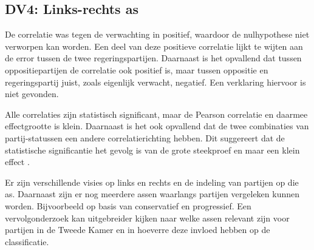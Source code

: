 \subsection{DV4: Links-rechts as}
De correlatie was tegen de verwachting in positief, waardoor de nulhypothese niet verworpen kan worden. Een deel van deze positieve correlatie lijkt te wijten aan de error tussen de twee regeringspartijen. Daarnaast is het opvallend dat tussen oppositiepartijen de correlatie ook positief is, maar tussen oppositie en regeringspartij juist, zoals eigenlijk verwacht, negatief. Een verklaring hiervoor is niet gevonden. \par
Alle correlaties zijn statistisch significant, maar de Pearson correlatie en daarmee effectgrootte is klein. Daarnaast is het ook opvallend dat de twee combinaties van partij-statussen een andere correlatierichting hebben. Dit suggereert dat de statistische significantie het gevolg is van de grote steekproef en maar een klein effect \cite{Hair}.\par
Er zijn verschillende visies op links en rechts en de indeling van partijen op die as. Daarnaast zijn er nog meerdere assen waarlangs partijen vergeleken kunnen worden. Bijvoorbeeld op basis van conservatief en progressief. Een vervolgonderzoek kan uitgebreider kijken naar welke assen relevant zijn voor partijen in de Tweede Kamer en in hoeverre deze invloed hebben op de classificatie. \par


